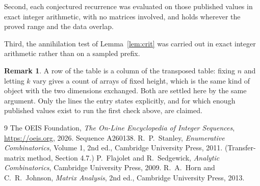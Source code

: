 \documentclass[11pt,a4paper]{article}
\theoremstyle{plain}
\theoremstyle{definition}
\newtheorem{remark}[theorem]{Remark}
\begin{document}
Second, each conjectured recurrence was evaluated on those published values in exact
integer arithmetic, with no matrices involved, and holds wherever the proved range and the
data overlap.

Third, the annihilation test of Lemma~\ref{lem:crit} was carried out in exact integer
arithmetic rather than on a sampled prefix.

\begin{remark}
A row of the table is a column of the transposed table: fixing $n$ and letting $k$ vary gives a
count of arrays of fixed height, which is the same kind of object with the two dimensions
exchanged. Both are settled here by the same argument. Only the lines the entry states
explicitly, and for which enough published values exist to run the first check above, are
claimed.
\end{remark}

\begin{thebibliography}{9}
 The OEIS Foundation, \emph{The On-Line Encyclopedia of Integer
Sequences}, \url{https://oeis.org}, 2026. Sequence A260138.
 R.~P.~Stanley, \emph{Enumerative Combinatorics}, Volume 1, 2nd ed.,
Cambridge University Press, 2011. (Transfer-matrix method, Section 4.7.)
 P.~Flajolet and R.~Sedgewick, \emph{Analytic Combinatorics}, Cambridge
University Press, 2009.
 R.~A.~Horn and C.~R.~Johnson, \emph{Matrix Analysis}, 2nd ed., Cambridge
University Press, 2013.
\end{thebibliography}
\end{document}
